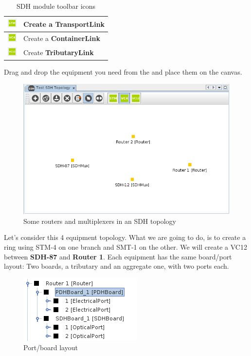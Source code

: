 \documentclass[a4paper]{article}
\begin{document}
\begin{table}[h!]
\begin{tabular}{lp{10cm}}
				\midrule
				\includegraphics[width=0.5cm]{img/sdh_module_transport_link.png} & Create a \textbf{TransportLink} \\
				\midrule
				\includegraphics[width=0.5cm]{img/sdh_module_container_link.png} & Create a \textbf{ContainerLink} \\
				\midrule
				\includegraphics[width=0.5cm]{img/sdh_module_tributary_link.png} & Create \textbf{TributaryLink} \\
			\end{tabular}
			\caption{SDH module toolbar icons}
			\label{tab:sdh_module_icons}
		\end{table}
		
		Drag and drop the equipment you need from the  and place them on the canvas.
		\begin{figure}[h!]
			\centering
			\includegraphics[width=\linewidth]{img/sdh_module_initial_view.png}
			\caption{Some routers and multiplexers in an SDH topology}
			\label{fig:sdh_module_initial_view}
		\end{figure}
		
		Let's consider this 4 equipment topology. What we are going to do, is to create a ring using STM-4 on one branch and SMT-1 on the other. We will create a VC12 between \textbf{SDH-87} and \textbf{Router 1}. Each equipment has the same board/port layout: Two boards, a tributary and an aggregate one, with two ports each.
		\begin{figure}[h!]
			\centering
			\includegraphics[width=0.4\linewidth]{img/sdh_module_layout.png}
			\caption{Port/board layout}
			\label{fig:sdh_module_layout}
		\end{figure}
		
\end{document}
